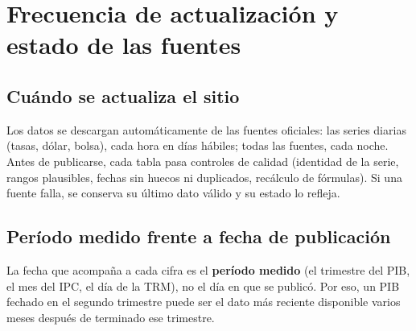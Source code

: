 \chapter{Frecuencia de actualización y estado de las fuentes}
\label{es:u:actualizacion}

\section{Cuándo se actualiza el sitio}
Los datos se descargan automáticamente de las fuentes oficiales: las series diarias (tasas, dólar, bolsa), cada
hora en días hábiles; todas las fuentes, cada noche. Antes de publicarse, cada tabla pasa controles de
calidad (identidad de la serie, rangos plausibles, fechas sin huecos ni duplicados, recálculo de fórmulas). Si
una fuente falla, se conserva su último dato válido y su estado lo refleja.

\section{Período medido frente a fecha de publicación}
La fecha que acompaña a cada cifra es el \textbf{período medido} (el trimestre del PIB, el mes del IPC, el día
de la TRM), no el día en que se publicó. Por eso, un PIB fechado en el segundo trimestre puede ser el dato más
reciente disponible varios meses después de terminado ese trimestre.

